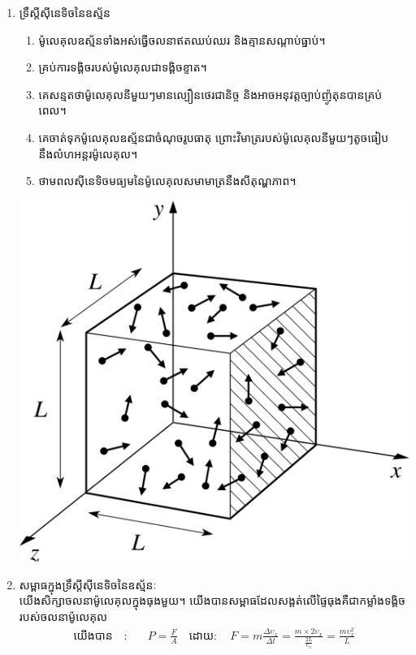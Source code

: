 \documentclass[12pt, a4paper]{article}
\begin{document}
\maketitle\koc
\begin{enumerate}[I]
	\item {\kml ទ្រឹស្តីសុីនេទិចនៃឧស្ម័ន}
	\begin{multicols}{2}
		\begin{enumerate}[m]
			\item ម៉ូលេគុលឧស្ម័នទាំងអស់ធ្វើចលនាឥតឈប់ឈរ និងគ្មានសណ្តាប់ធ្នាប់។
			\item គ្រប់ការទង្គិចរបស់ម៉ូលេគុលជាទង្គិចខ្ទាត។
			\item គេសន្មតថាម៉ូលេគុលនីមួយៗមានល្បឿនថេរជានិច្ច និងអាចអនុវត្តច្បាប់ញ៉ូតុនបានគ្រប់ពេល។
			\item គេចាត់ទុកម៉ូលេគុលឧស្ម័នជាចំណុចរូបធាតុ ព្រោះវិមាត្ររបស់ម៉ូលេគុលនីមួយៗតូចធៀបនឹងលំហអន្តរម៉ូលេគុល។
			\item ថាមពលសុីនេទិចមធ្យមនៃម៉ូលេគុលសមាមាត្រនឹងសីតុណ្ហភាព។
		\end{enumerate}
		\includegraphics[scale=1]{01}
	\end{multicols}
	\item {\kml សម្ពាធក្នុងទ្រឹស្តីសុីនេទិចនៃឧស្ម័នៈ}\\
	\quad យើងសិក្សាចលនាម៉ូលេគុលក្នុងធុងមួយ។ យើងបានសម្ពាធដែលសង្តត់លើផ្ទៃធុងគឺជាកម្លាំងទង្គិចរបស់ចលនាម៉ូលេគុល
	\begin{align*}
		\text{យើងបាន}\quad :&\quad P=\frac{F}{A}\quad \text{ដោយ}: \quad F=m\frac{\Delta \upsilon_{x}}{\Delta t}=\frac{m\times2\upsilon_{x}}{\frac{2L}{\upsilon_{x}}}=\frac{m\upsilon^{2}_{x}}{L}\\

\end{align*}
\end{enumerate}
\end{document}
